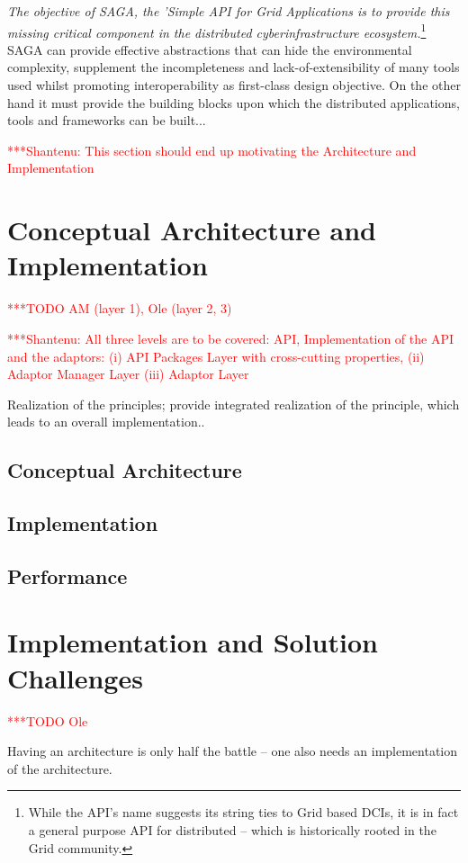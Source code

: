 \documentclass[a4paper,10pt]{article}
\newcommand{\todo}[1]{     {\textcolor{red}  { ***TODO      #1 }}}
\newcommand{\jhanote}[1]{  {\textcolor{red}  { ***Shantenu: #1 }}}
\newcommand{\todo}[1]{}
\newcommand{\jhanote}[1]{}
\begin{document}
 {\it The objective of SAGA, the 'Simple API for Grid Applications is
   to provide this missing critical component in the distributed
   cyberinfrastructure ecosystem.}\footnote{While the API's name
   suggests its string ties to Grid based DCIs, it is in fact a
   general purpose API for distributed -- which is historically rooted
   in the Grid community.}  SAGA can provide effective abstractions
 that can hide the environmental complexity, supplement the
 incompleteness and lack-of-extensibility of many tools used whilst
 promoting interoperability as first-class design objective.  On the
 other hand it must provide the building blocks upon which the
 distributed applications, tools and frameworks can be built...


\jhanote{This section should end up motivating the Architecture and
 Implementation}

\section{Conceptual Architecture and Implementation} \todo{AM (layer 1), Ole (layer 2, 3)}

\jhanote{All three levels are to be covered: API, Implementation of
  the API and the adaptors: (i) API Packages Layer with cross-cutting
  properties, (ii) Adaptor Manager Layer (iii) Adaptor Layer}

 Realization of the principles; provide integrated realization of the
 principle, which leads to an overall implementation..

 \subsection{Conceptual Architecture}

 \subsection{Implementation}

 \subsection{Performance}



\section{Implementation and Solution Challenges}\todo{Ole}

Having an architecture is only half the battle -- one also needs an
implementation of the architecture.
\end{document}
